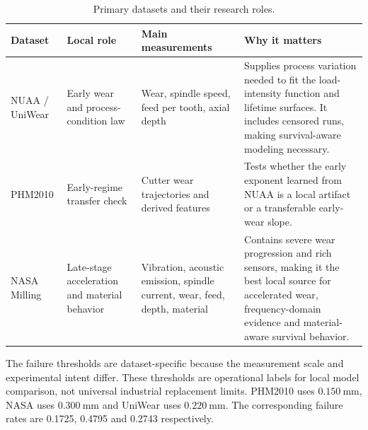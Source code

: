 \documentclass[10pt]{article}
\begin{document}
\begin{table}[!t]
  \centering
  \caption{Primary datasets and their research roles.}
  \label{tab:dataset-roles}
  \footnotesize
  \begin{tabularx}{\textwidth}{p{2.6cm}p{3.0cm}p{3.2cm}Y}
    \toprule
    Dataset & Local role & Main measurements & Why it matters \\
    \midrule
    NUAA / UniWear & Early wear and process-condition law & Wear, spindle speed, feed per tooth, axial depth & Supplies process variation needed to fit the load-intensity function and lifetime surfaces. It includes censored runs, making survival-aware modeling necessary. \\
    PHM2010 & Early-regime transfer check & Cutter wear trajectories and derived features & Tests whether the early exponent learned from NUAA is a local artifact or a transferable early-wear slope. \\
    NASA Milling & Late-stage acceleration and material behavior & Vibration, acoustic emission, spindle current, wear, feed, depth, material & Contains severe wear progression and rich sensors, making it the best local source for accelerated wear, frequency-domain evidence and material-aware survival behavior. \\
    \bottomrule
  \end{tabularx}
\end{table}

The failure thresholds are dataset-specific because the measurement scale and experimental intent differ. These thresholds are operational labels for local model comparison, not universal industrial replacement limits. PHM2010 uses \(0.150~\mathrm{mm}\), NASA uses \(0.300~\mathrm{mm}\) and UniWear uses \(0.220~\mathrm{mm}\). The corresponding failure rates are 0.1725, 0.4795 and 0.2743 respectively.
\end{document}
